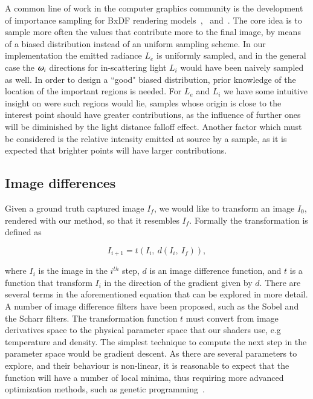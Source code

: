 A common line of work in the computer graphics community is the development of importance sampling for BxDF rendering models~\cite{Lawrence:2004},~\cite{Ou:2012} and~\cite{Wang:2014}.
The core idea is to sample more often the values that contribute more to the final image, by means of a biased distribution instead of an uniform sampling scheme.
In our implementation the emitted radiance $L_e$ is uniformly sampled, and in the general case the $\boldsymbol{\omega}_i$ directions for in-scattering light $L_i$ would have been naively sampled as well.
In order to design a ``good" biased distribution, prior knowledge of the location of the important regions is needed. 
For $L_e$ and $L_i$ we have some intuitive insight on were such regions would lie, samples whose origin is close to the interest point should have greater contributions, as the influence of further ones will be diminished by the light distance falloff effect.
Another factor which must be considered is the relative intensity emitted at source by a sample, as it is expected that brighter points will have larger contributions. 

\subsection{Image differences}
\label{sec:image_differences}

Given a ground truth captured image $I_f$, we would like to transform an image $I_0$, rendered with our method, so that it resembles $I_f$.
Formally the transformation is defined as

\begin{equation}
I_{i+1} = t(I_i,~d(I_i,~I_f)),
\end{equation}

where $I_i$ is the image in the $i^{th}$ step, $d$ is an image difference function, and $t$ is a function that transform $I_i$ in the direction of the gradient given by $d$.
There are several terms in the aforementioned equation that can be explored in more detail.
A number of image difference filters have been proposed, such as the Sobel and the Scharr filters.
The transformation function $t$ must convert from image derivatives space to the physical parameter space that our shaders use, e.g temperature and density.
The simplest technique to compute the next step in the parameter space would be gradient descent.
As there are several parameters to explore, and their behaviour is non-linear, it is reasonable to expect that the function will have a number of local minima, thus requiring more advanced optimization methods, such as genetic programming~\cite{Dobashi:2012}.

